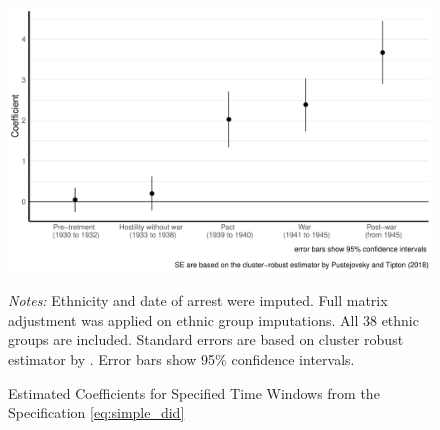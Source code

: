 \begin{figure}[h]
\centering
\caption{Estimated Coefficients for Specified Time Windows from the Specification \ref{eq:simple_did} }
\includegraphics[width=\textwidth]{plots/effects/ethnicity_imputation/annual/time_window_pre_treatment_date_imp.pdf}
\begin{minipage}{0.92\textwidth}
\footnotesize
\emph{Notes:} Ethnicity and date of arrest were imputed.  Full matrix adjustment was applied on ethnic group imputations. All 38 ethnic groups are included. Standard errors are based on cluster robust estimator by \citet{pustejovsky_small-sample_2018}. Error bars show 95\% confidence intervals. 
\end{minipage}
\label{fig:did_effets_time_window}
\end{figure}




